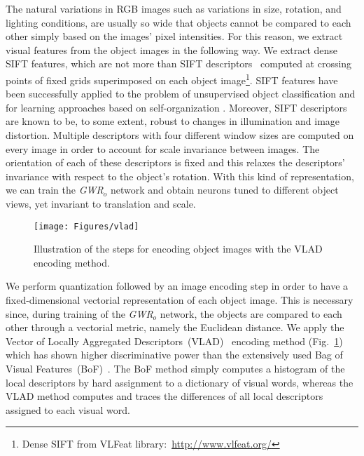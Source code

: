 \documentclass[5p,times]{elsarticle}
\begin{document}
The natural variations in RGB images such as variations in size, rotation, and lighting conditions, are usually so wide that objects cannot be compared to each other simply based on the images' pixel intensities.
For this reason, we extract visual features from the object images in the following way. 
We extract dense SIFT features, which are not more than SIFT descriptors~\citep{lowe2004distinctive} computed at crossing points of fixed grids superimposed on each object image\footnote{Dense SIFT from VLFeat library:~\href{http://www.vlfeat.org/}{http://www.vlfeat.org/}}.
SIFT features have been successfully applied to the problem of unsupervised object classification \citep{tuytelaars2010unsupervised} and for learning approaches based on self-organization \citep{kinnunen2012unsupervised}.
Moreover, SIFT descriptors are known to be, to some extent, robust to changes in illumination and image distortion.
Multiple descriptors with four different window sizes are computed on every image in order to account for scale invariance between images.
The orientation of each of these descriptors is fixed and this relaxes the descriptors' invariance with respect to the object's rotation.
With this kind of representation, we can train the \textit{GWR}$_o$ network and obtain neurons tuned to different object views, yet invariant to translation and scale. 

\begin{figure}
\centering
\texttt{[image: Figures/vlad]}
\caption{Illustration of the steps for encoding object images with the VLAD encoding method.}
\label{fig:vlad}
\end{figure}

We perform quantization followed by an image encoding step in order to have a fixed-dimensional vectorial representation of each object image.
This is necessary since, during training of the \textit{GWR}$_o$ network, the objects are compared to each other through a vectorial metric, namely the Euclidean distance.
We apply the Vector of Locally Aggregated Descriptors~(VLAD)~\citep{jegou2012aggregating} encoding method (Fig.~\ref{fig:vlad}) which has shown higher discriminative power than the extensively used Bag of Visual Features~(BoF)~\cite{everingham2010pascal, szeliski2010computer}.
The BoF method simply computes a histogram of the local descriptors by hard assignment to a dictionary of visual words, whereas the VLAD method computes and traces the differences of all local descriptors assigned to each visual word.
\end{document}
